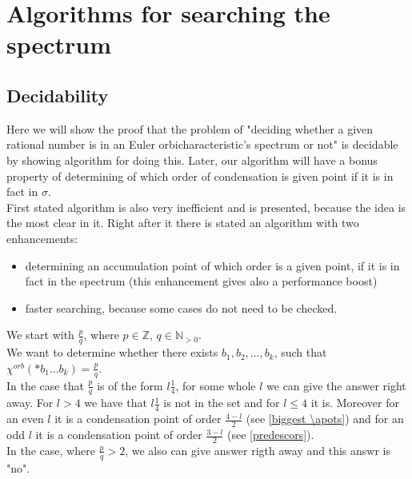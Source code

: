 \chapter{Algorithms for searching the spectrum}

\section{Decidability}
Here we will show the proof that the problem of "deciding whether a given rational number is in an 
Euler orbicharacteristic's spectrum or not" is decidable by showing algorithm for doing this. 
Later, our algorithm will have a bonus property of determining of which order of condensation 
is given point if it is in fact in $\sigma$. \\
First stated algorithm is also very inefficient and is presented, because the idea is the most 
clear in it. Right after it there is stated an algorithm with two enhancements: 
\begin{itemize}
\item determining an accumulation point of which order is a given point, if it is in fact in the 
spectrum (this enhancement gives also a performance boost)
\item faster searching, because some cases do not need to be checked. 
\end{itemize}
We start with $\frac{p}{q}$, where $p \in \mathbb{Z}$, $q \in \mathbb{N}_{>0}$. \\ 

We want to determine whether there exists $b_1,b_2,\dots,b_k$, such that $\chi^{orb}(*b_1\dots b_k) = 
\frac{p}{q}$. \\ 

In the case that $\frac{p}{q}$ is of the form $l\frac{1}{4}$, for some whole $l$ 
we can give the answer right away. For $l > 4$ we have that $l\frac{1}{4}$ is not in the set 
and for $l \leq 4$ it is. Moreover for an even $l$ it is a condensation point of order 
$\frac{4-l}{2}$ (see \ref{biggest \apots})
and for an odd $l$ it is a condensation point of order $\frac{3-l}{2}$ (see \ref{predescors}). \\

In the case, where $\frac{p}{q} >2$, we also can give answer rigth away and this answr is "no". \\

